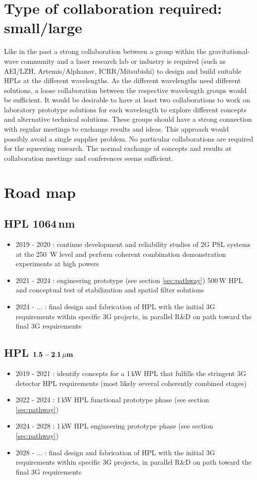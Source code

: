 \section{Type of collaboration required:  small/large}
Like in the past a strong collaboration between a group within the gravitational-wave community and a laser research lab or industry is required (such as AEI/LZH, Artemis/Alphanov, ICRR/Mitsubishi) to design and build suitable HPLs at the different wavelengths. As the different wavelengths need different solutions, a loose collaboration between the respective wavelength groups would be sufficient. It would be desirable to have at least two collaborations to work on laboratory prototype solutions for each wavelength to explore different concepts and alternative technical solutions. These groups should have a strong connection with regular meetings to exchange results and ideas. This approach would possibly avoid a single supplier problem.
No particular collaborations are required for the squeezing research. The normal exchange of concepts and results at collaboration meetings and conferences seems sufficient. 

\section{Road map}
\subsection*{HPL 1064\,nm}
\begin{itemize}
	\item 2019 - 2020 : continue development and reliability studies of 2G PSL systems at the 250\, W level and perform coherent combination demonstration experiments at high powers
	\item 2021 - 2024 : engineering prototype (see section \ref{sec:pathway}) 500\,W HPL and conceptual test of stabilization and spatial filter solutions
	\item 2024 - ... : final design and fabrication of HPL with the initial 3G requirements within specific 3G projects, in parallel R\&D on path toward the final 3G requirements 
\end{itemize} 


\subsection*{HPL ${\bf 1.5 - 2.1 \, {\bf \mu m}}$}
\begin{itemize}
	\item 2019 - 2021 : identify concepts for a 1\,kW HPL that fulfills the stringent 3G detector HPL requirements (most likely several coherently combined stages)
	\item 2022 - 2024 : 1\,kW HPL functional prototype phase (see section \ref{sec:pathway})
	\item 2024 - 2028 : 1\,kW HPL engineering prototype phase (see section \ref{sec:pathway})
	\item 2028 - ... : final design and fabrication of HPL with the initial 3G requirements within specific 3G projects, in parallel R\&D on path toward the final 3G requirements
\end{itemize} 


